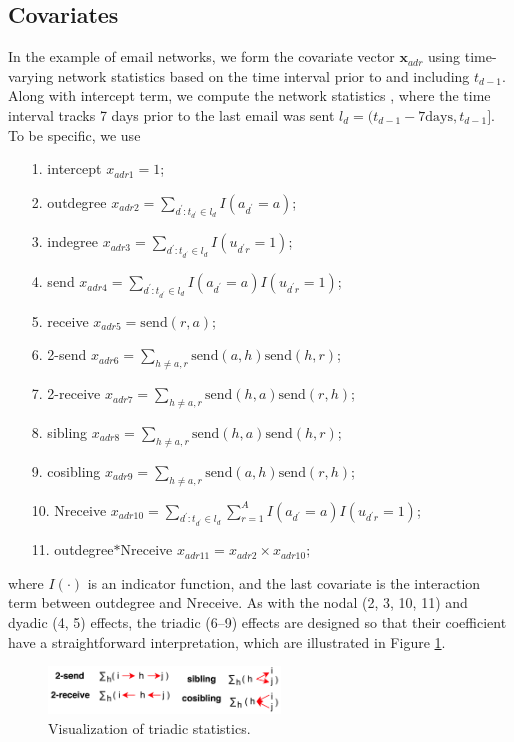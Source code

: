 \documentclass[12pt]{article}
\begin{document}
 	   \subsection{Covariates}\label{subsec:Covariates_email}
	In the example of email networks, we form the covariate vector $\boldsymbol{x}_{adr}$ using time-varying network statistics based on the time interval prior to and including $t_{d-1}$. Along with intercept term, we compute the network statistics \citep{PerryWolfe2012}, where the time interval tracks 7 days prior to the last email was sent $l_d = (t_{d-1}-7\mbox{days}, t_{d-1}]$. To be specific, we use
	\begin{itemize}
		\item[1.] intercept ${x}_{adr1} =1$;
		\item[2.] outdegree ${x}_{adr2} =\sum\limits_{d^\prime: t_{d^\prime} \in l_d} I(a_{d^\prime} = a)$;
		\item[3.] indegree ${x}_{adr3}=\sum\limits_{d^\prime: t_{d^\prime} \in l_d} I(u_{d^\prime r} = 1)$;
		\item[4.] send ${x}_{adr4}=\sum\limits_{d^\prime: t_{d^\prime} \in l_d} I(a_{d^\prime} = a)I(u_{d^\prime r} = 1)$;
		\item[5.] receive ${x}_{adr5}=\mbox{send}(r,a)$;
		\item[6.] 2-send ${x}_{adr6} = \sum\limits_{h \neq a, r} \mbox{send}(a,h)\mbox{send}(h,r)$;
		\item[7.] 2-receive ${x}_{adr7}= \sum\limits_{h \neq a, r} \mbox{send}(h,a)\mbox{send}(r,h)$;
		\item[8.] sibling ${x}_{adr8}=\sum\limits_{h \neq a, r} \mbox{send}(h,a)\mbox{send}(h,r)$;
		\item[9.] cosibling ${x}_{adr9}=\sum\limits_{h \neq a, r} \mbox{send}(a,h)\mbox{send}(r,h)$;
		\item[10.] Nreceive ${x}_{adr10}=\sum\limits_{d^\prime: t_{d^\prime} \in l_d} \sum\limits_{r=1}^A I(a_{d^\prime} = a)I(u_{d^\prime r} = 1)$;
		\item[11.] outdegree$*$Nreceive ${x}_{adr11} = {x}_{adr2}\times{x}_{adr10};$
	\end{itemize}
	where $I(\cdot)$ is an indicator function, and the last covariate is the interaction term between outdegree and Nreceive. As with the nodal (2, 3, 10, 11) and dyadic (4, 5) effects, the triadic (6--9) effects are designed so that their coefficient have a straightforward interpretation, which are illustrated in Figure \ref{figure:netstats}.
		\begin{figure}[H]
			\centering
			\includegraphics[width=0.55\textwidth]{plots_paper/triad.png}	
			\caption {Visualization of triadic statistics.}
			\label{figure:netstats}
		\end{figure}
\end{document}
